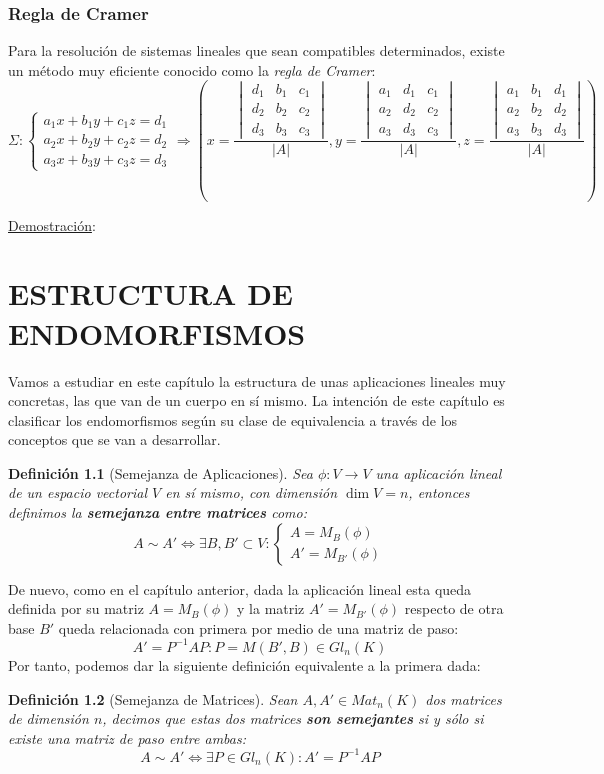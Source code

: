 \documentclass[10pt,a4paper,openright]{book}
\theoremstyle{break}
\newtheorem*{defi}{Definición}
\begin{document}
\subsection{Regla de Cramer}
Para la resolución de sistemas lineales que sean compatibles determinados, existe un método muy eficiente conocido como la \textit{regla de Cramer}:
$$\Sigma:\begin{cases}a_1x+b_1y+c_1z=d_1 \\ a_2x+b_2y+c_2z=d_2 \\ a_3x+b_3y+c_3z=d_3 \end{cases}\Rightarrow \left( x=\frac{\begin{vmatrix} d_1 & b_1 & c_1 \\ d_2 & b_2 & c_2 \\ d_3 & b_3 & c_3 \end{vmatrix}}{|A|}, y=\frac{\begin{vmatrix} a_1 & d_1 & c_1 \\ a_2 & d_2 & c_2 \\ a_3 & d_3 & c_3 \end{vmatrix}}{|A|}, z=\frac{\begin{vmatrix} a_1 & b_1 & d_1 \\ a_2 & b_2 & d_2 \\ a_3 & b_3 & d_3 \end{vmatrix}}{|A|} \right)$$

\underline{Demostración}:

\chapter{ESTRUCTURA DE \\ ENDOMORFISMOS}
Vamos a estudiar en este capítulo la estructura de unas aplicaciones lineales muy concretas, las que van de un cuerpo en sí mismo. La intención de este capítulo es clasificar los endomorfismos según su clase de equivalencia a través de los conceptos que se van a desarrollar.

\begin{defi}[Semejanza de Aplicaciones]
Sea $\phi: V\rightarrow V$ una aplicación lineal de un espacio vectorial $V$ en sí mismo, con dimensión $\dim V = n$, entonces definimos la \textbf{semejanza entre matrices} como:
$$A\sim A' \Leftrightarrow \exists B, B'\subset V : \begin{cases}
A=M_{B}(\phi) \\ A'=M_{B'}(\phi) \end{cases}$$
\end{defi}
De nuevo, como en el capítulo anterior, dada la aplicación lineal esta queda definida por su matriz $A=M_B(\phi)$ y la matriz $A'=M_{B'}(\phi)$ respecto de otra base $B'$ queda relacionada con primera por medio de una matriz de paso:
$$A'= P^{-1}AP: P=M(B',B)\in Gl_n(K)$$
Por tanto, podemos dar la siguiente definición equivalente a la primera dada:
\begin{defi}[Semejanza de Matrices]
Sean $A,A'\in Mat_{n}(K)$ dos matrices de dimensión $n$, decimos que estas dos matrices \textbf{son semejantes} si y sólo si existe una matriz de paso entre ambas:
$$A\sim A' \Leftrightarrow \exists P \in Gl_n(K) : A' = P^{-1}AP$$
\end{defi}
\end{document}
